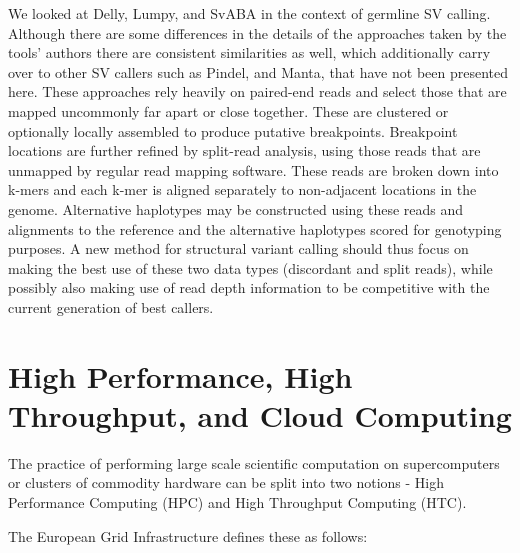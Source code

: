 We looked at Delly, Lumpy, and SvABA in the context of germline SV calling. Although there are some differences in the details of the approaches taken by the tools' authors there are consistent similarities as well, which additionally carry over to other SV callers such as Pindel\autocite{ye2009pindel}, and Manta\autocite{chen2015manta}, that have not been presented here. These approaches rely heavily on paired-end reads and select those that are mapped uncommonly far apart or close together. These are clustered or optionally locally assembled to produce putative breakpoints. Breakpoint locations are further refined by split-read analysis, using those reads that are unmapped by regular read mapping software. These reads are broken down into k-mers and each k-mer is aligned separately to non-adjacent locations in the genome. Alternative haplotypes may be constructed using these reads and alignments to the reference and the alternative haplotypes scored for genotyping purposes. A new method for structural variant calling should thus focus on making the best use of these two data types (discordant and split reads), while possibly also making use of read depth information to be competitive with the current generation of best callers. 
\newpage

\section{High Performance, High Throughput, and Cloud Computing}

The practice of performing large scale scientific computation on supercomputers or clusters of commodity hardware can be split into two notions - High Performance Computing (HPC) and High Throughput Computing (HTC).

The European Grid Infrastructure defines these as follows\autocite{Glossary_V1_-_EGIWiki_2016-10-28}:



